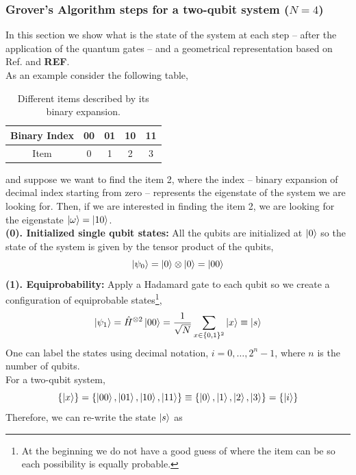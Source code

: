 \subsubsection{Grover's Algorithm steps for a two-qubit system ($N=4$)}
In this section we show what is the state of the system at each step -- after the application of the quantum gates -- and a geometrical representation based on Ref. \cite{Lavor2008Search} and \textbf{REF}.\\
As an example consider the following table,
\begin{table}[h]
\label{tab:GroverSearch}
\centering
\begin{tabular}{ c | c | c | c | c }
  \hline			
  Binary Index & 00 & 01 & 10 & 11 \\
    \hline		
  Item & 0 & 1 & 2 & 3 \\
  \hline  
\end{tabular}
\caption{Different items described by its binary expansion.}
\end{table}
and suppose we want to find the item 2, where the index -- binary expansion of decimal index starting from zero -- represents the eigenstate of the system we are looking for. Then, if we are interested in finding the item 2, we are looking for the eigenstate $\ket{\omega} = \ket{10}$.\\
\textbf{(0). Initialized single qubit states:} All the qubits are initialized at $\ket{0}$ so the state of the system is given by the tensor product of the qubits,
\begin{equation}
    \ket{\psi_{0}} = \ket{0}\otimes \ket{0} = \ket{00}
\end{equation}
\textbf{(1). Equiprobability:} Apply a Hadamard gate to each qubit so we create a configuration of equiprobable states\footnote{At the beginning we do not have a good guess of where the item can be so each possibility is equally probable.},
\begin{equation}
    \ket{\psi_{1}} = \hat{H}^{\otimes 2}\ket{00} = \frac{1}{\sqrt{N}}\sum_{x \in \{0,1\}^{2}}\ket{x} \equiv \ket{s}
\end{equation}
 One can label the states using decimal notation, $i = 0 ,\ldots, 2^{n} -1$, where $n$ is the number of qubits.\\
For a two-qubit system,
\begin{equation}
   \{\ket{x}\} = \{\ket{00},\ket{01},\ket{10},\ket{11}\} \equiv \{\ket{0},\ket{1},\ket{2},\ket{3}\} = \{\ket{i}\}
\end{equation}
Therefore, we can re-write the state $\ket{s}$ as
